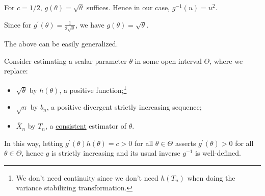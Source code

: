 \begin{claim}
	For \(c = 1 / 2\), \(g(\theta ) = \sqrt{\theta } \) suffices. Hence in our case, \(g^{-1} (u) = u^2\).
\end{claim}
\begin{explanation}
	Since for \(g^{\prime} (\theta ) = \frac{1}{2 \sqrt{\theta } }\), we have \(g(\theta ) = \sqrt{\theta } \).
\end{explanation}

\begin{remark}
	The above can be easily generalized.
\end{remark}
\begin{explanation}
	Consider estimating a scalar parameter \(\theta \) in some open interval \(\Theta \), where we replace:
	\begin{itemize}
		\item \(\sqrt{\theta }\) by \(h(\theta )\), a positive function;\footnote{We don't need continuity since we don't need \(h(T_n)\) when doing the variance stabilizing transformation.}
		\item \(\sqrt{n}\) by \(b_n\), a positive divergent strictly increasing sequence;
		\item \(\overline{X} _n\) by \(T_n\), a \hyperref[def:consistent]{consistent} estimator of \(\theta \).
	\end{itemize}
	In this way, letting \(g^{\prime} (\theta ) h(\theta ) = c > 0\) for all \(\theta \in \Theta \) asserts \(g^{\prime} (\theta ) > 0\) for all \(\theta \in \Theta \), hence \(g\) is strictly increasing and its usual inverse \(g^{-1} \) is well-defined.
\end{explanation}